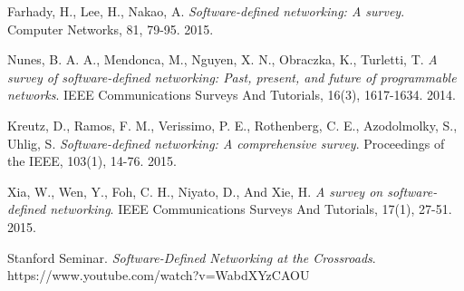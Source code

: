 \documentclass[conference]{IEEEtran}
\begin{document}
\begin{thebibliography}{5}

Farhady, H., Lee, H., Nakao, A. 
\textit{Software-defined networking: A survey}. 
Computer Networks, 81, 79-95. 2015.

Nunes, B. A. A., Mendonca, M., Nguyen, X. N., Obraczka, K., Turletti, T.
\textit{A survey of software-defined networking: Past, present, and future of programmable networks}.
IEEE Communications Surveys And Tutorials, 16(3), 1617-1634. 2014.

Kreutz, D., Ramos, F. M., Verissimo, P. E., Rothenberg, C. E., Azodolmolky, S.,  Uhlig, S.
\textit{Software-defined networking: A comprehensive survey}. 
Proceedings of the IEEE, 103(1), 14-76. 2015.

Xia, W., Wen, Y., Foh, C. H., Niyato, D., And Xie, H.
\textit{A survey on software-defined networking}. 
IEEE Communications Surveys And Tutorials, 17(1), 27-51. 2015.

Stanford Seminar.
\textit{ Software-Defined Networking at the Crossroads}. 
https://www.youtube.com/watch?v=WabdXYzCAOU

\end{thebibliography}







\end{document}
